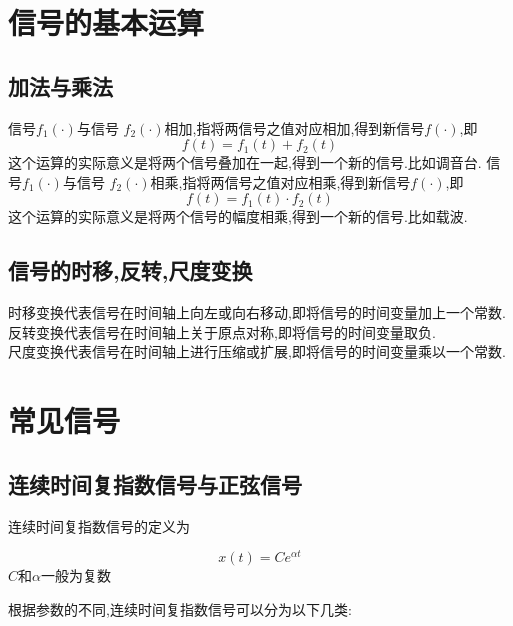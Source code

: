 \section{信号的基本运算}
\subsection{加法与乘法}
\quad 信号$f_1(\cdot)$与信号 $f_2(\cdot)$相加,指将两信号之值对应相加,得到新信号$f(\cdot)$,即
\begin{equation}
    f(t)=f_1(t)+f_2(t)
\end{equation}
这个运算的实际意义是将两个信号叠加在一起,得到一个新的信号.比如调音台.
\quad 信号$f_1(\cdot)$与信号 $f_2(\cdot)$相乘,指将两信号之值对应相乘,得到新信号$f(\cdot)$,即
\begin{equation}
    f(t)=f_1(t)\cdot f_2(t)
\end{equation}
这个运算的实际意义是将两个信号的幅度相乘,得到一个新的信号.比如载波.
\subsection{信号的时移,反转,尺度变换}
时移变换代表信号在时间轴上向左或向右移动,即将信号的时间变量加上一个常数.\\
反转变换代表信号在时间轴上关于原点对称,即将信号的时间变量取负.\\
尺度变换代表信号在时间轴上进行压缩或扩展,即将信号的时间变量乘以一个常数.\\ 
\section{常见信号}
\subsection{连续时间复指数信号与正弦信号}
连续时间复指数信号的定义为
\begin{definition}
    \[
    x(t) = C e^{\alpha t}
    \]
$C\text{和}\alpha$一般为复数
\end{definition}
根据参数的不同,连续时间复指数信号可以分为以下几类:
